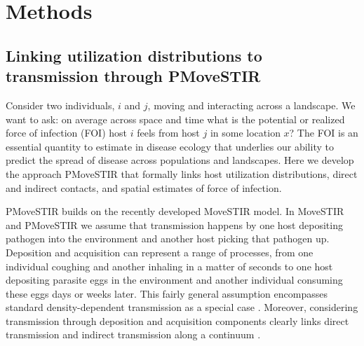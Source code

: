 \documentclass[letterpaper]{article}
\begin{document}





\section*{Methods}

\subsection*{Linking utilization distributions to transmission through PMoveSTIR}

Consider two individuals, $i$ and $j$, moving and interacting across a landscape.  We want to ask: on average across space and time what is the potential or realized force of infection (FOI) host $i$ feels from host $j$ in some location $x$?  
The FOI is an essential quantity to estimate in disease ecology that underlies our ability to predict the spread of disease across populations and landscapes. 
Here we develop the approach PMoveSTIR that formally links host utilization distributions, direct and indirect contacts, and spatial estimates of force of infection.

PMoveSTIR builds on the recently developed MoveSTIR model. 
In MoveSTIR and PMoveSTIR we assume that transmission happens by one host depositing pathogen into the environment and another host picking that pathogen up.  
Deposition and acquisition can represent a range of processes, from one individual coughing and another inhaling in a matter of seconds to one host depositing parasite eggs in the environment and another individual consuming these eggs days or weeks later. 
This fairly general assumption encompasses standard density-dependent transmission as a special case \citep{Cortez2021}. 
Moreover, considering transmission through deposition and acquisition components clearly links direct transmission and indirect transmission along a continuum \citep{Wilber2022}.
\end{document}
